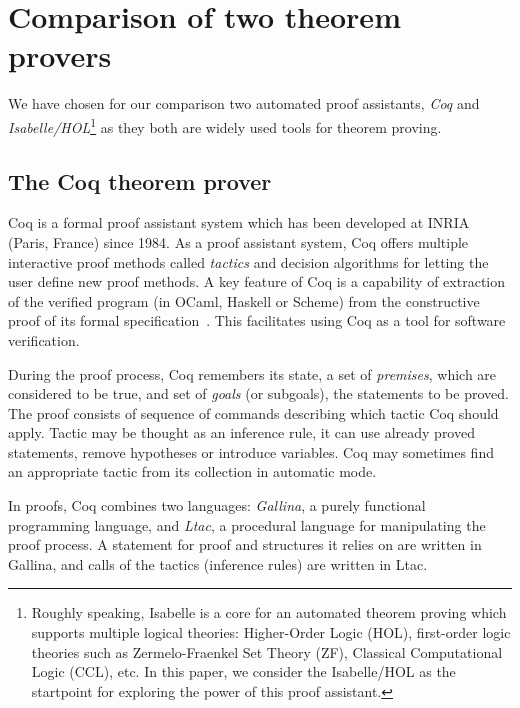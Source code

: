 \documentclass[article]{aaltoseries}
\begin{document}
\section{Comparison of two theorem provers}
\label{sec:comparison}

We have chosen for our comparison two automated proof assistants, \textit{Coq} and \textit{Isabelle/HOL}\footnote{Roughly speaking, Isabelle is a core for an automated theorem proving which supports multiple logical theories: Higher-Order Logic (HOL), first-order logic theories such as Zermelo-Fraenkel Set Theory (ZF), Classical Computational Logic (CCL), etc. In this paper, we consider the Isabelle/HOL as the startpoint for exploring the power of this proof assistant.} as they both are widely used tools for theorem proving.


\subsection{The Coq theorem prover}
\label{sec:prover_coq}

Coq is a formal proof assistant system which has been developed at INRIA (Paris, France) since 1984. As a proof assistant system, Coq offers multiple interactive proof methods called \textit{tactics} and decision algorithms for letting the user define new proof methods. A key feature of Coq is a capability of extraction of the verified program (in OCaml, Haskell or Scheme) from the constructive proof of its formal specification~\cite{Let08}. This facilitates using Coq as a tool for software verification.

During the proof process, Coq remembers its state, a set of \textit{premises}, which are considered to be true, and set of \textit{goals} (or subgoals), the statements to be proved. The proof consists of sequence of commands describing which tactic Coq should apply. Tactic may be thought as an inference rule, it can use already proved statements, remove hypotheses or introduce variables. Coq may sometimes find an appropriate tactic from its collection in automatic mode.

In proofs, Coq combines two languages: \textit{Gallina}, a purely functional programming language, and \textit{Ltac}, a procedural language for manipulating the proof process. A statement for proof and structures it relies on are written in Gallina, and calls of the tactics (inference rules) are written in Ltac.
\end{document}
